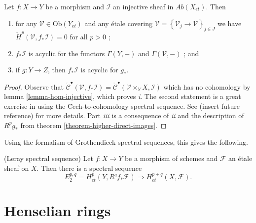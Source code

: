 \begin{lemma}
\label{lemma-prepare-leray}
Let $f: X\to Y$ be a morphism and $\mathcal{I}$ an injective sheaf in
$\textit{Ab}(X_{et})$. Then
\begin{enumerate}
\item
for any $\mathcal{V}\in\text{Ob}(Y_{et})$ and any \'etale covering
$\mathcal{V}=\left\{\mathcal{V}_j\to \mathcal{V}\right\}_{j\in J}$ we have
$\check H^p(\mathcal{V}, f_*\mathcal{I}) = 0$ for all $p>0$ ;
\item
$f_*\mathcal{I}$ is acyclic for the functors $\Gamma(Y, -)$ and
$\Gamma(\mathcal{V},-)$ ; and
\item
if $g: Y\to Z$, then $f_*\mathcal{I}$ is acyclic for $g_*$.
\end{enumerate}
\end{lemma}

\begin{proof}
Observe that $\check{\mathcal{C}}^\bullet(\mathcal{V}, f_*\mathcal{I}) =
\check{\mathcal{C}}^\bullet(\mathcal{V}\times_Y X, \mathcal{I})$ which has no
cohomology by lemma \ref{lemma-hom-injective}, which proves {\it i}. The
second statement is a great exercise in using the \u Cech-to-cohomology
spectral sequence. See (insert future reference) for more details. Part {\it
iii} is a consequence of {\it ii} and the description of $R^pg_*$ from theorem
\ref{theorem-higher-direct-images}.
\end{proof}

\noindent
Using the formalism of Grothendieck spectral sequences, this gives the
following.

\begin{proposition}
\label{proposition-leray}
(Leray spectral sequence)
Let $f: X \to Y$ be a morphism of schemes and $\mathcal{F}$ an \'etale sheaf on
$X$. Then there is a spectral sequence
$$
E_2^{p,q} = H_{et}^p(Y, R^qf_*\mathcal{F}) \Rightarrow H_{et}^{p+q}(X,
\mathcal{F}).
$$
\end{proposition}





\section{Henselian rings}
\label{section-heselian-ring}

